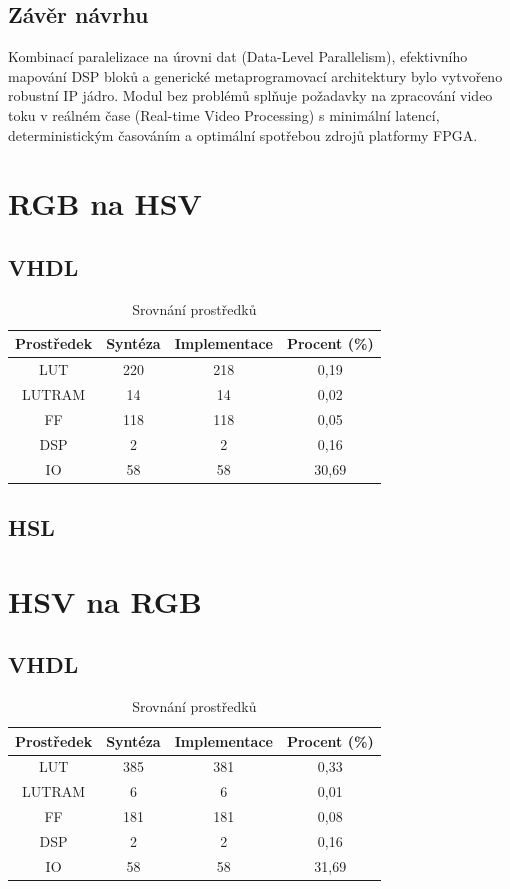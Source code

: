 \subsection{Závěr návrhu}
Kombinací paralelizace na úrovni dat (Data-Level Parallelism), efektivního mapování DSP bloků a generické metaprogramovací architektury bylo vytvořeno robustní IP jádro. Modul bez problémů splňuje požadavky na zpracování video toku v reálném čase (Real-time Video Processing) s minimální latencí, deterministickým časováním a optimální spotřebou zdrojů platformy FPGA.

\section{RGB na HSV}
\subsection{VHDL}

\begin{table}[!h]
    \centering
    \begin{tabular}{cccc}\toprule
         Prostředek&  Syntéza&  Implementace& Procent (\%)\\\midrule
         LUT&  220&  218& 0,19\\
         LUTRAM&  14&  14
& 0,02\\
         FF&  118&  118
& 0,05\\ 
         DSP& 2& 2
&0,16\\
         IO& 58& 58&30,69\\ \bottomrule
    \end{tabular}
    \caption{Srovnání prostředků}
    \label{tab:rgb2hsv}
\end{table}
\subsection{HSL}

\newpage
\section{HSV na RGB}

\subsection{VHDL}

\begin{table}[!h]
    \centering
    \begin{tabular}{cccc}
        Prostředek& Syntéza& Implementace& Procent (\%)\\\midrule
        LUT &  385 & 381 & 0,33 \\
        LUTRAM& 6 & 6 & 0,01 \\
        FF& 181 & 181 & 0,08\\
        DSP& 2 & 2 & 0,16\\
        IO& 58 & 58 & 31,69\\ \bottomrule
    \end{tabular}
    \caption{Srovnání prostředků}
    \label{tab:hsv2rgb}
\end{table}

